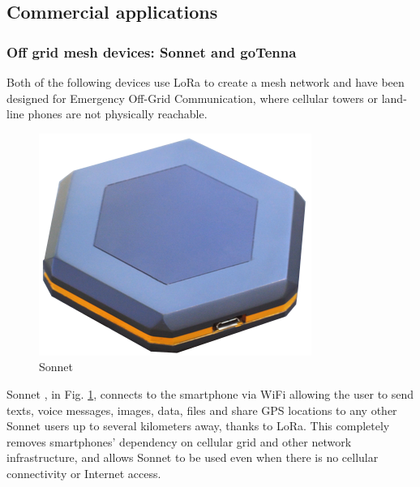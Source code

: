		\subsection{Commercial applications}

			\subsubsection{Off grid mesh devices: Sonnet and goTenna}
			
				Both of the following devices use LoRa to create a mesh network and have been designed for Emergency Off-Grid Communication, where cellular towers or land-line phones are not physically reachable.
				
				\begin{minipage}{0.38\textwidth}%
					\begin{figure}[H]
						\centering
						\includegraphics[width=.8\textwidth]{resources/img/chap4/sonnet}
						\caption{Sonnet}
						\label{img:sonnet}
					\end{figure}
				\end{minipage}%
				\hfill%
				\begin{minipage}{0.52\textwidth}\raggedright
					Sonnet \footnotemark, in Fig. \ref{img:sonnet}, connects to the smartphone via WiFi allowing the user to send texts, voice messages, images, data, files and share GPS locations to any other Sonnet users up to several kilometers away, thanks to LoRa.
					This completely removes smartphones' dependency on cellular grid and other network infrastructure, and allows Sonnet to be used even when there is no cellular connectivity or Internet access.
				\end{minipage}		
				\newline
			

